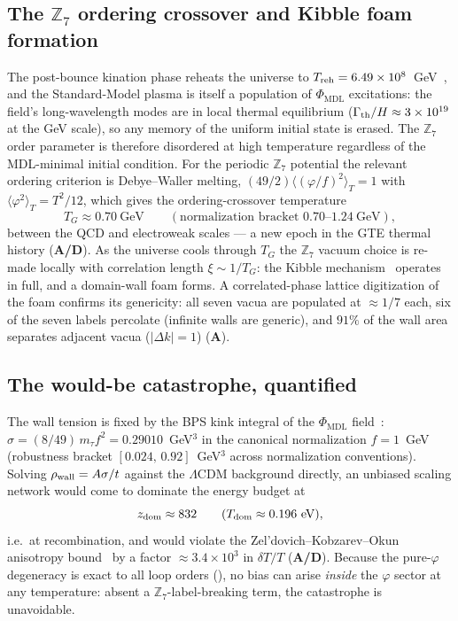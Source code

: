 \documentclass[11pt]{article}
\theoremstyle{remark}
\newcommand{\PHIMDL}{\Phi_{\mathrm{MDL}}}
\newcommand{\ZS}{\mathbb{Z}_7}
\newcommand{\CatA}{\textbf{A}}
\newcommand{\CatAD}{\textbf{A/D}}
\begin{document}
\subsection{The $\ZS$ ordering crossover and Kibble foam formation}
\label{sec:defect-crossover}

The post-bounce kination phase reheats the universe to
$T_{\rm reh} = 6.49\times10^{8}$~GeV~\cite{SpivackQGR}, and the Standard-Model
plasma is itself a population of $\PHIMDL$ excitations: the field's
long-wavelength modes are in local thermal equilibrium
($\Gamma_{\rm th}/H \approx 3\times10^{19}$ at the GeV scale), so any memory of
the uniform initial state is erased. The $\ZS$ order parameter is therefore
disordered at high temperature regardless of the MDL-minimal initial condition.
For the periodic $\ZS$ potential the relevant ordering criterion is
Debye--Waller melting, $(49/2)\langle(\varphi/f)^2\rangle_T = 1$ with
$\langle\varphi^2\rangle_T = T^2/12$, which gives the ordering-crossover
temperature
\begin{equation}
  T_G \approx 0.70\ \text{GeV}
  \qquad (\text{normalization bracket } 0.70\text{--}1.24\ \text{GeV}),
  \label{eq:tg}
\end{equation}
between the QCD and electroweak scales --- a new epoch in the GTE thermal
history (\CatAD). As the universe cools through $T_G$ the $\ZS$ vacuum choice is
re-made locally with correlation length $\xi \sim 1/T_G$: the Kibble
mechanism~\cite{Kibble1976} operates in full, and a domain-wall foam forms. A
correlated-phase lattice digitization of the foam confirms its genericity: all
seven vacua are populated at $\approx 1/7$ each, six of the seven labels
percolate (infinite walls are generic), and $91\%$ of the wall area separates
adjacent vacua ($|\Delta k| = 1$) (\CatA).

\subsection{The would-be catastrophe, quantified}
\label{sec:defect-catastrophe}

The wall tension is fixed by the BPS kink integral of the $\PHIMDL$
field~\cite{SpivackPhiMDLField}: $\sigma = (8/49)\,m_\tau f^2 = 0.29010$~GeV$^3$
in the canonical normalization $f = 1$~GeV (robustness bracket
$[0.024,\,0.92]$~GeV$^3$ across normalization conventions). Solving $\rho_{\rm wall} = A\sigma/t$ against the
$\Lambda$CDM background directly, an unbiased scaling network would come to
dominate the energy budget at
\begin{equation}
  z_{\rm dom} \approx 832 \qquad (T_{\rm dom} \approx 0.196\ \text{eV}),
\end{equation}
i.e.\ at recombination, and would violate the Zel'dovich--Kobzarev--Okun
anisotropy bound~\cite{ZeldovichKobzarevOkun1974} by a factor
$\approx 3.4\times10^{3}$ in $\delta T/T$ (\CatAD). Because the pure-$\varphi$
degeneracy is exact to all loop orders (), no bias can
arise \emph{inside} the $\varphi$ sector at any temperature: absent a
$\ZS$-label-breaking term, the catastrophe is unavoidable.
\end{document}
